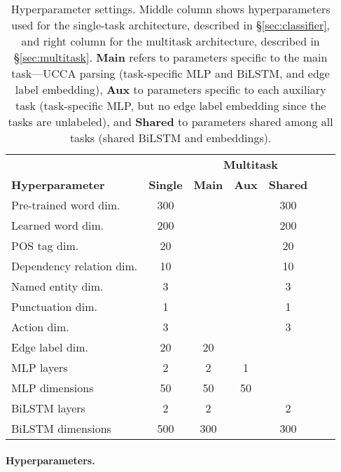 \documentclass[11pt,a4paper]{article}
\begin{document}
\begin{table}[h]
\centering
\small
\setlength\tabcolsep{2pt}
\begin{tabular}{l|c|ccccc}
&& \multicolumn{3}{c}{\bf Multitask} \\ 
\bf Hyperparameter &  \bf Single & \bf Main & \bf Aux & \bf Shared \\
\hline
Pre-trained word dim. & 300 &&& 300 \\
Learned word dim. & 200 &&& 200 \\
POS tag dim. & 20 &&& 20 \\
Dependency relation dim. & 10 &&& 10 \\
Named entity dim. & 3 &&& 3 \\
Punctuation dim. & 1 &&& 1 \\
Action dim. & 3 &&& 3 \\
Edge label dim. & 20 & 20 \\
\hline
MLP layers & 2 & 2 & 1 \\
MLP dimensions & 50 & 50 & 50 \\
BiLSTM layers & 2 & 2 & & 2 \\
BiLSTM dimensions & 500 & 300 & & 300
\end{tabular}
\caption{Hyperparameter settings.
Middle column shows hyperparameters used for the single-task architecture,
described in \S\ref{sec:classifier}, and
right column for the multitask architecture,
described in \S\ref{sec:multitask}.
\textbf{Main} refers to parameters specific to the main task---UCCA parsing
(task-specific MLP and BiLSTM, and edge label embedding),
\textbf{Aux} to parameters specific to each auxiliary task
(task-specific MLP, but no edge label embedding since the tasks are unlabeled),
and \textbf{Shared} to parameters shared among all tasks
(shared BiLSTM and embeddings).\label{tab:hyperparams}}
\end{table}


\paragraph{Hyperparameters.}
\end{document}
